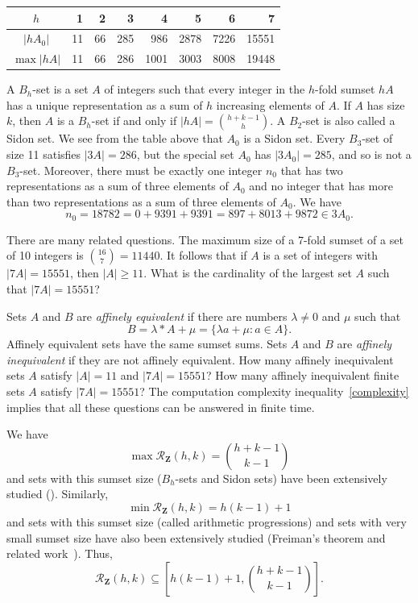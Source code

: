 \documentclass{amsart}
\newcommand{\beq}{\begin{equation}}
\newcommand{\eeq}{\end{equation}}
\newcommand{\Z}{\ensuremath{\mathbf Z}}
\newcommand{\mcr}{\ensuremath{ \mathcal R}}
\begin{document}
\begin{center}
\begin{tabular}{c|r|r|r|r|r|r|r}
$h$ & 1 & 2 & 3 &4 & 5 & 6 & 7 \\ \hline
$|hA_0|$& 11 & 66 & 285 &  986 & 2878 & 7226 & 15551 \\ \hline 
$\max |hA|$ &  11 & 66 & 286 & 1001 & 3003 & 8008 & 19448 
\end{tabular}
\end{center}

 A $B_h$-set is a set $A$ of integers such that every integer 
 in the $h$-fold sumset $hA$ has a unique representation as a sum of 
 $h$ increasing elements of $A$.  
 If $A$ has size $k$, then $A$ is a $B_h$-set if and only if 
 $|hA| =  \binom{h+k-1}{h}$. 
 A $B_2$-set is also called a Sidon set.
 We see from the table above that $A_0$ is a Sidon set.  
Every $B_3$-set of size 11 satisfies $|3A| = 286$, but the special set $A_0$ 
has $|3A_0| = 285$, and so is not a $B_3$-set.  
Moreover, there must be exactly one integer $n_0$ that has two 
representations as a sum of three elements of $A_0$ and 
no integer that has more than two representations 
as a sum of three elements of $A_0$.  We have 
\[
n_0 = 18782 = 0 + 9391 + 9391 = 897 + 8013 + 9872 \in 3A_0.
\]


There are many related questions.  
The maximum size of a 7-fold sumset of a set of 10 integers is 
$\binom{16}{7} = 11440$.  It follows that if $A$ is a set of integers 
with $|7A| = 15551$, then $|A| \geq 11$.  
What is the cardinality of the  largest set  $A$ such that $|7A| = 15551$?

Sets $A$ and $B$ are \emph{affinely equivalent} if there are numbers 
$\lambda \neq 0$ and $\mu$ such that 
\[
B = \lambda\ast A + \mu = \{\lambda a+ \mu: a \in A\}.
\]
Affinely equivalent sets have the same sumset sums.  
Sets $A$ and $B$ are \emph{affinely inequivalent} 
if they are not affinely equivalent.  
How many affinely inequivalent sets $A$ satisfy $|A| = 11$ 
and $|7A| = 15551$?
How many affinely inequivalent finite sets $A$ satisfy $|7A| = 15551$?
The computation complexity inequality~\eqref{complexity} 
implies that all these questions can be answered in finite time.    

We have 
\[
\max \mcr_{\Z}(h,k) = \binom{h+k-1}{k-1} 
\]
and sets with this sumset size ($B_h$-sets and Sidon sets) have been extensively studied (\cite{nath-ubiq,nath-Canada,nath2502,obry04}).
Similarly, 
\[
\min \mcr_{\Z}(h,k) = h(k-1)+1
\]
and sets with this sumset size (called arithmetic progressions) 
and sets with very small sumset size have also been extensively studied 
(Freiman's theorem and related work~\cite{nath1996bb,tao-vu06}). 
Thus,
\beq      \label{R-interval}
\mcr_{\Z}(h,k) \subseteq \left[ h(k-1)+1, \binom{h+k-1}{k-1} \right].
\eeq
\end{document}
